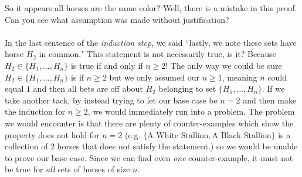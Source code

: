So it appears all horses are the same color? Well, there is a mistake in this proof. Can you see what assumption was made without justification?\\ \\
In the last sentence of the \textit{induction step}, we said ``lastly, we note these sets have horse $H_2$ in common." This statement is not necessarily true, is it? Because $H_2 \in \{H_1,...,H_n\}$ is true if and only if $n\geq 2$! The only way we could be sure $H_2 \in \{H_1,...,H_n\}$ is if $n\geq 2$ but we only assumed our $n\geq 1$, meaning $n$ could equal $1$ and then all bets are off about $H_2$ belonging to set $\{H_1,...,H_n\}$. If we take another tack, by instead trying to let our base case be $n=2$ and then make the induction for $n\geq 2$, we would immediately run into a problem. The problem we would encounter is that there are plenty of counter-examples which show the property does not hold for $n=2$ (e.g. $\{\text{A White Stallion},\text{A Black Stallion}\}$ is a collection of $2$ horses that does not satisfy the statement.) so we would be unable to prove our base case. Since we can find even \textit{one} counter-example, it must not be true for \textit{all} sets of horses of size $n$. \\

